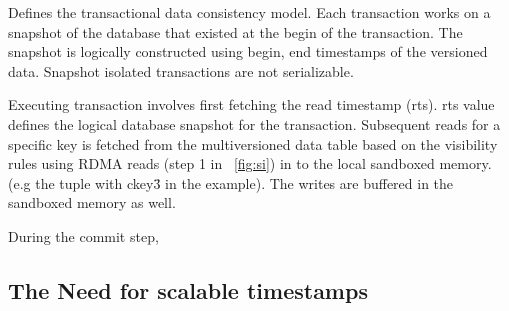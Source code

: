 Defines the transactional data consistency model. Each transaction works on a snapshot of the database that
existed at the begin of the transaction. The snapshot is logically constructed using begin, end timestamps of the
versioned data. Snapshot isolated transactions are not serializable.

Executing transaction involves first fetching the read timestamp (rts). rts value defines the logical database
snapshot for the transaction. Subsequent reads for a specific key is fetched from the multiversioned data table
based on the visibility rules using RDMA reads (step 1 in ~\ref{fig:si}) in to the local sandboxed memory.(e.g the tuple with ckey\=3 in
the example). The writes are buffered in the sandboxed memory as well. 

During the commit step, 



\subsection{The Need for scalable timestamps}
